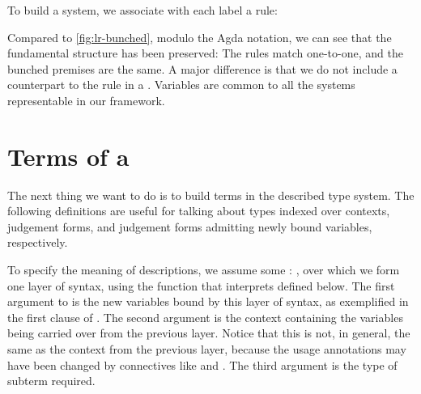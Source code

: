 \noindent
\begin{minipage}[t]{0.5\textwidth}
\end{minipage}
\begin{minipage}[t]{0.5\textwidth}
\end{minipage}

To build a system, we associate with each label a rule:


Compared to \cref{fig:lr-bunched}, modulo the Agda notation, we can see
that the fundamental structure has been preserved: The rules match
one-to-one, and the bunched premises are the same. A major difference
is that we do not include a counterpart to the
 rule in a
. Variables are common to all the systems
representable in our framework.

\section{Terms of a }\label{sec:terms-of-system}

The next thing we want to do is to build terms in the described type system.
The following definitions are useful for talking about types indexed over
contexts, judgement forms, and judgement forms admitting newly bound variables,
respectively.


To specify the meaning of descriptions, we assume some
\AgdaSpace{}\AgdaSymbol:\AgdaSpace{}%
\AgdaSpace{}\AgdaSymbol{\_},
over which we form one layer of syntax, using the function
 that interprets
 defined below.  The first argument to
 is the new variables bound by this layer of syntax, as
exemplified in the first clause of
.  The second argument is
the context containing the variables being carried over from the
previous layer.  Notice that this is not, in general, the same as the
context from the previous layer, because the usage annotations may
have been changed by connectives like
 and
.  The third argument is the
type of subterm required.

